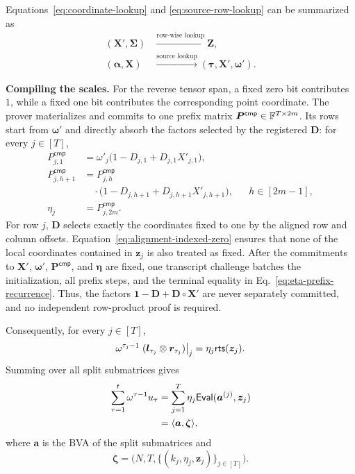 Equations~\eqref{eq:coordinate-lookup} and
\eqref{eq:source-row-lookup} can be summarized as
\begin{equation}
\label{eq:point-lookup}
\begin{aligned}
    (\bm X',\bm\Sigma)
    &\xrightarrow{\text{row-wise lookup}}
    \bm Z,\\
    (\bm\alpha,\bm X)
    &\xrightarrow{\text{source lookup}}
    (\bm\tau,\bm X',\bm\omega').
\end{aligned}
\end{equation}

\mysmallskip\noindent
\textbf{Compiling the scales.}
For the reverse tensor span, a fixed zero bit contributes $1$, while a fixed
one bit contributes the corresponding point coordinate.  The prover
materializes and commits to one prefix matrix
$\bm P^{\mathsf{cmp}}\in{\mathbb{F}}^{T\times2m}$.  Its rows start from
$\bm\omega'$ and directly absorb the factors selected by the registered
$\bm D$: for every $j\in[T]$,
\begin{equation}
\label{eq:eta-prefix-recurrence}
\begin{aligned}
P^{\mathsf{cmp}}_{j,1}
&=
\omega'_j
\bigl(1-D_{j,1}+D_{j,1}X'_{j,1}\bigr),\\
P^{\mathsf{cmp}}_{j,h+1}
&=
P^{\mathsf{cmp}}_{j,h}\\[-1mm]
&\quad\cdot
\bigl(1-D_{j,h+1}+D_{j,h+1}X'_{j,h+1}\bigr),
&&h\in[2m-1],\\
\eta_j&=P^{\mathsf{cmp}}_{j,2m}.
\end{aligned}
\end{equation}
For row $j$, $\bm D$ selects exactly the coordinates fixed to one by the
aligned row and column offsets.  Equation~\eqref{eq:alignment-indexed-zero}
ensures that none of the local coordinates contained in $\bm z_j$ is also
treated as fixed.  After the commitments to $\bm X'$, $\bm\omega'$,
$\bm P^{\mathsf{cmp}}$, and $\bm\eta$ are fixed, one transcript challenge
batches the initialization, all prefix steps, and the terminal equality in
Eq.~\eqref{eq:eta-prefix-recurrence}.  Thus, the factors
$\bm1-\bm D+\bm D\circ\bm X'$ are never separately committed, and no
independent row-product proof is required.

Consequently, for every $j\in[T]$,
\begin{equation}
\label{eq:single-bucket-compilation}
    \omega^{\tau_j-1}
    \left.
    (\bm l_{\tau_j}\mathbin{\otimes}\bm r_{\tau_j})
    \right|_j
    =
    \eta_j{\sf rts}(\bm z_j).
\end{equation}
Summing over all split submatrices gives
\begin{equation}
\label{eq:compiled-bva-tbv}
\begin{aligned}
\sum_{\tau=1}^{t}
    \omega^{\tau-1}u_\tau
&=
\sum_{j=1}^{T}
    \eta_j
    \mathsf{Eval}(\bm a^{(j)}, \bm z_j)\\
&= 
\langle\bm a,\bm\zeta\rangle,
\end{aligned}
\end{equation}
where $\bm a$ is the BVA of the split submatrices and
\[
    \bm\zeta
    =
    \bigl(
        N,T,
        \{(k_j,\eta_j,\bm z_j)\}_{j\in[T]}
    \bigr).
\]

